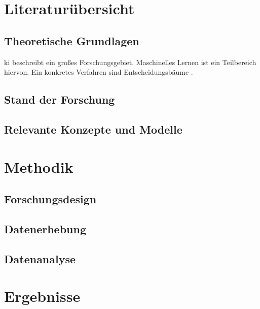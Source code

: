 \documentclass[twoside=false,DIV=8]{scrbook}
\begin{document}
\lipsum[5-8]

\chapter{Literaturübersicht}

\section{Theoretische Grundlagen}

\Gls{ki} beschreibt ein großes Forschungsgebiet. Maschinelles Lernen ist ein Teilbereich hiervon. Ein konkretes Verfahren sind Entscheidungsbäume \autocite{knuth_2021}.

\lipsum[1-2]

\section{Stand der Forschung}

\lipsum[2]

\section{Relevante Konzepte und Modelle}

\lipsum[3-5]

\chapter{Methodik}

\section{Forschungsdesign}

\lipsum[1]

\section{Datenerhebung}

\lipsum[2]

\section{Datenanalyse}

\lipsum[3]

\chapter{Ergebnisse}
\end{document}
